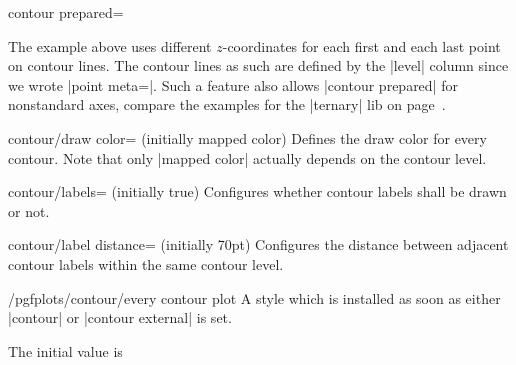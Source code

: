 {{\begin{plottype}[/pgfplots]{contour prepared=\textcolor{black}{}}
\begin{codeexample}[]
\end{codeexample}
    \noindent The example above uses different $z$-coordinates for each first
    and each last point on contour lines. The contour lines as such are defined
    by the |level| column since we wrote |point meta=|. Such a
    feature also allows |contour prepared| for nonstandard axes, compare the
    examples for the |ternary| lib on page~\pageref{page:ternary:contour}.

    \begin{pgfplotskey}{contour/draw color= (initially mapped color)}
        Defines the draw color for every contour. Note that only |mapped color|
        actually depends on the contour level.
    \end{pgfplotskey}

    \begin{pgfplotskey}{contour/labels= (initially true)}
        Configures whether contour labels shall be drawn or not.
    \end{pgfplotskey}

    \begin{pgfplotskey}{contour/label distance= (initially 70pt)}
        Configures the distance between adjacent contour labels within the same
        contour level.
    \end{pgfplotskey}

    \begin{stylekey}{/pgfplots/contour/every contour plot}
        A style which is installed as soon as either |contour| or
        |contour external| is set.

        The initial value is
\begin{codeexample}
\end{codeexample}
    \end{stylekey}


\end{plottype}}}
